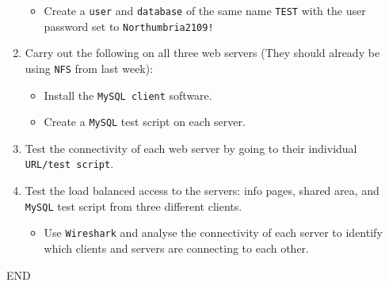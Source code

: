 \documentclass[11pt]{article}
\begin{document}
\begin{enumerate}
\begin{itemize}
            \item Create a \texttt{user} and \texttt{database} of the same name \texttt{TEST} with the user password set to \texttt{Northumbria2109!}
        \end{itemize}
    \item Carry out the following on all three web servers (They should already be using \texttt{NFS} from last week):
        \begin{itemize}
            \item Install the \texttt{MySQL client} software.
            \item Create a \texttt{MySQL} test script on each server.
        \end{itemize}
    \item Test the connectivity of each web server by going to their individual \texttt{URL/test script}.
    \item Test the load balanced access to the servers: info pages, shared area, and \texttt{MySQL} test script from three different clients.
        \begin{itemize}
            \item Use \texttt{Wireshark} and analyse the connectivity of each server to identify which clients and servers are connecting to each other.
        \end{itemize}
\end{enumerate}    
END
\end{document}
